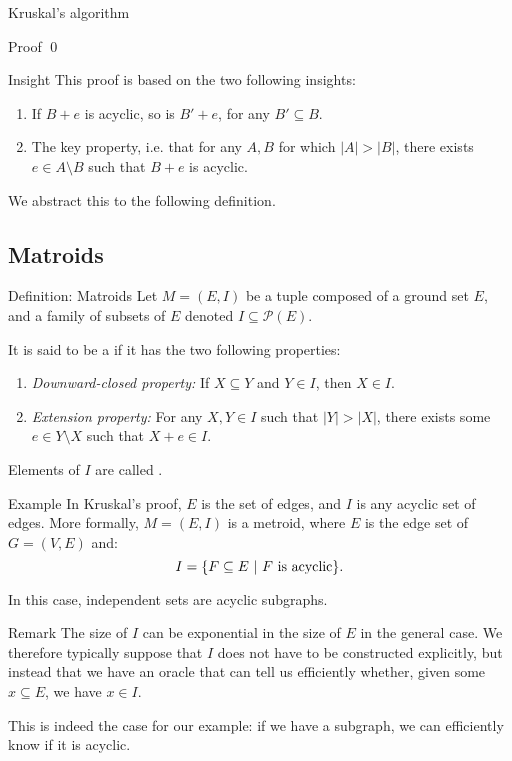 \documentclass[a4paper]{article}
\begin{document}
\begin{parag}{Kruskal's algorithm}
\begin{subparag}{Proof}
        \qed
    \end{subparag}

    \begin{subparag}{Insight}
        This proof is based on the two following insights: 
        \begin{enumerate}
            \item If $B+e$ is acyclic, so is $B' + e$, for any $B' \subseteq B$. 
            \item The key property, i.e. that for any $A, B$ for which $\left|A\right| > \left|B\right|$, there exists $e \in A \setminus B$ such that $B+e$ is acyclic.
        \end{enumerate}

        We abstract this to the following definition.
    \end{subparag}
\end{parag}

\subsection{Matroids}
\begin{parag}{Definition: Matroids}
    Let $M = \left(E, I\right)$ be a tuple composed of a ground set $E$, and a family of subsets of $E$ denoted $I \subseteq \mathcal{P}\left(E\right)$.

    It is said to be a  if it has the two following properties:
    \begin{enumerate}
        \item \textit{Downward-closed property:} If $X \subseteq Y$ and $Y \in I$, then $X \in I$.
        \item \textit{Extension property:} For any $X, Y \in I$ such that $\left|Y\right| > \left|X\right|$, there exists some $e \in Y \setminus X$ such that $X + e \in I$.
    \end{enumerate}

    Elements of $I$ are called .

    \begin{subparag}{Example}
        In Kruskal's proof, $E$ is the set of edges, and $I$ is any acyclic set of edges. More formally, $M = \left(E, I\right)$ is a metroid, where $E$ is the edge set of $G = \left(V, E\right)$ and: 
        \[I = \left\{F \subseteq E \suchthat \text{$F$ is acyclic}\right\}.\]

        In this case, independent sets are acyclic subgraphs.
    \end{subparag}

    \begin{subparag}{Remark}
        The size of $I$ can be exponential in the size of $E$ in the general case. We therefore typically suppose that $I$ does not have to be constructed explicitly, but instead that we have an oracle that can tell us efficiently whether, given some $x \subseteq E$, we have $x \in I$.

        This is indeed the case for our example: if we have a subgraph, we can efficiently know if it is acyclic.
    \end{subparag}
\end{parag}
\end{document}
